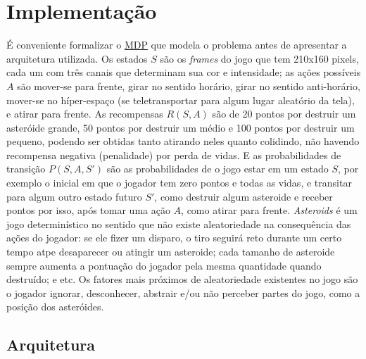 % 



\chapter{Implementação}
\label{cap:implementacao}


É conveniente formalizar o \hyperref[sec:mdp]{MDP} que modela o problema antes de apresentar a arquitetura utilizada.
Os estados $S$ são os \textit{frames} do jogo que tem 210x160 pixels, cada um com três canais que determinam sua cor e intensidade;
as ações possíveis $A$ são mover-se para frente, girar no sentido horário, girar no sentido anti-horário, mover-se no híper-espaço (se teletransportar para algum lugar aleatório da tela), e atirar para frente.
As recompensas $R(S,A)$ são de 20 pontos por destruir um asteróide grande, 50 pontos por destruir um médio e 100 pontos por destruir um pequeno, podendo ser obtidas tanto atirando neles quanto colidindo, não havendo recompensa negativa (penalidade) por perda de vidas.
E as probabilidades de transição $P(S,A,S')$ são as probabilidades de o jogo estar em um estado $S$, por exemplo o inicial em que o jogador tem zero pontos e todas as vidas, e transitar para algum outro estado futuro $S'$, como destruir algum asteroide e receber pontos por isso, após tomar uma ação $A$, como atirar para frente.
\textit{Asteroids} é um jogo determinístico no sentido que não existe aleatoriedade na consequência das ações do jogador: se ele fizer um disparo, o tiro seguirá reto durante um certo tempo atpe desaparecer ou atingir um asteroide; cada tamanho de asteroide sempre aumenta a pontuação do jogador pela mesma quantidade quando destruído; e etc.
Os fatores mais próximos de aleatoriedade existentes no jogo são o jogador ignorar, desconhecer, abstrair e/ou não perceber partes do jogo, como a posição dos asteróides.


\section{Arquitetura}
\label{sec:arq}

